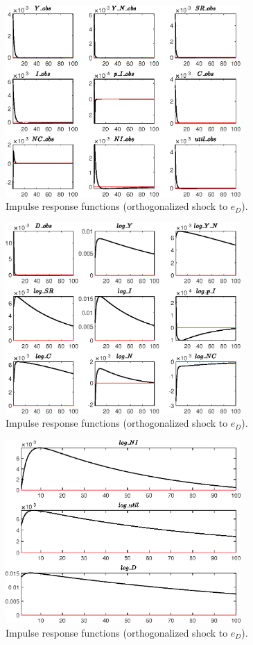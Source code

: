  
\begin{figure}[H]
\centering 
\includegraphics[width=0.80\textwidth]{BRS_growth_KPR_D/graphs/BRS_growth_KPR_D_IRF_e_D1}
\caption{Impulse response functions (orthogonalized shock to ${e_D}$).}\label{Fig:IRF:e_D:1}
\end{figure}
 
\begin{figure}[H]
\centering 
\includegraphics[width=0.80\textwidth]{BRS_growth_KPR_D/graphs/BRS_growth_KPR_D_IRF_e_D2}
\caption{Impulse response functions (orthogonalized shock to ${e_D}$).}\label{Fig:IRF:e_D:2}
\end{figure}
 
\begin{figure}[H]
\centering 
\includegraphics[width=0.80\textwidth]{BRS_growth_KPR_D/graphs/BRS_growth_KPR_D_IRF_e_D3}
\caption{Impulse response functions (orthogonalized shock to ${e_D}$).}\label{Fig:IRF:e_D:3}
\end{figure}
 
 
